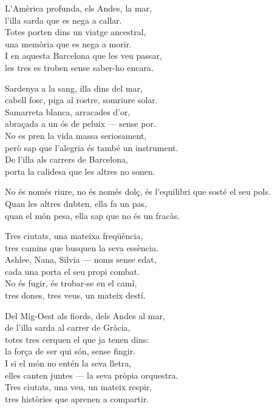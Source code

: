 \begin{lyrics}
L'Amèrica profunda, els Andes, la mar,\\
l'illa sarda que es nega a callar.\\
Totes porten dins un viatge ancestral,\\
una memòria que es nega a morir.\\
I en aquesta Barcelona que les veu passar,\\
les tres es troben sense saber-ho encara.

Sardenya a la sang, illa dins del mar,\\
cabell fosc, piga al rostre, somriure solar.\\
Samarreta blanca, arracades d'or,\\
abraçada a un ós de peluix — sense por.\\
No es pren la vida massa seriosament,\\
però sap que l'alegria és també un instrument.\\
De l'illa als carrers de Barcelona,\\
porta la calidesa que les altres no sonen.

No és només riure, no és només dolç,
és l'equilibri que sosté el seu pols.\\
Quan les altres dubten, ella fa un pas,\\
quan el món pesa, ella sap que no és un fracàs.

Tres ciutats, una mateixa freqüència,\\
tres camins que busquen la seva essència.\\
Ashlee, Nana, Silvia — noms sense edat,\\
cada una porta el seu propi combat.\\
No és fugir, és trobar-se en el camí,\\
tres dones, tres veus, un mateix destí.

Del Mig-Oest als fiords, dels Andes al mar,\\
de l'illa sarda al carrer de Gràcia,\\
totes tres cerquen el que ja tenen dins:\\
la força de ser qui són, sense fingir.\\
I si el món no entén la seva lletra,\\
elles canten juntes — la seva pròpia orquestra.\\
Tres ciutats, una veu, un mateix respir,\\
tres històries que aprenen a compartir.
\end{lyrics}

